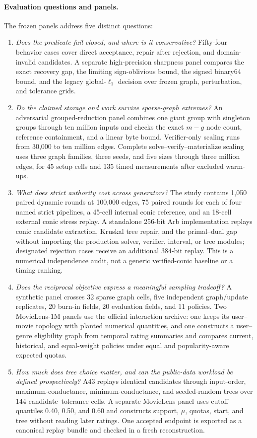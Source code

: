 \documentclass[smallextended,envcountsect]{svjour3}
\begin{document}
\paragraph{Evaluation questions and panels.}
The frozen panels address five distinct questions:
\begin{enumerate}[leftmargin=*,itemsep=2pt]
 \item \emph{Does the predicate fail closed, and where is it conservative?}
 Fifty-four behavior cases cover direct acceptance, repair after rejection, and
 domain-invalid candidates.  A separate high-precision sharpness panel compares
 the exact recovery gap, the limiting sign-oblivious bound, the signed binary64
 bound, and the legacy global-$\ell_1$ decision over frozen graph, perturbation,
 and tolerance grids.
 \item \emph{Do the claimed storage and work survive sparse-graph extremes?}
 An adversarial grouped-reduction panel combines one giant group with singleton
 groups through ten million inputs and checks the exact $m-g$ node count,
 reference containment, and a linear byte bound.  Verifier-only scaling runs
 from 30,000 to ten million edges.  Complete solve--verify--materialize scaling
 uses three graph families, three seeds, and five sizes through three million
 edges, for 45 setup cells and 135 timed measurements after excluded warm-ups.
 \item \emph{What does strict authority cost across generators?}
 The study contains 1,050 paired dynamic rounds at 100,000 edges, 75 paired
 rounds for each of four named strict pipelines, a 45-cell internal conic
 reference, and an 18-cell external conic stress replay.  A standalone 256-bit
 Arb implementation replays conic candidate extraction, Kruskal tree
 repair, and the primal--dual gap without importing the production solver,
 verifier, interval, or tree modules; designated rejection cases receive an
 additional 384-bit replay.  This is a numerical independence audit, not a
 generic verified-conic baseline or a timing ranking.
 \item \emph{Does the reciprocal objective express a meaningful sampling
 tradeoff?}  A synthetic panel crosses 32 sparse graph cells, five independent
 graph/update replicates, 20 burn-in fields, 20 evaluation fields, and 11
 policies.  Two MovieLens-1M panels use the official interaction archive: one
 keeps its user--movie topology with planted numerical quantities, and one
 constructs a user--genre eligibility graph from temporal rating summaries and
 compares current, historical, and equal-weight policies under equal and
 popularity-aware expected quotas.
 \item \emph{How much does tree choice matter, and can the public-data workload
 be defined prospectively?}  A43 replays identical candidates through
 input-order, maximum-conductance, minimum-conductance, and seeded-random trees
 over 144 candidate--tolerance cells.  A separate MovieLens panel uses cutoff
 quantiles 0.40, 0.50, and 0.60 and constructs support, $\mu$, quotas, start,
 and tree without reading later ratings.  One accepted endpoint is exported as
 a canonical replay bundle and checked in a fresh reconstruction.
\end{enumerate}
\end{document}
